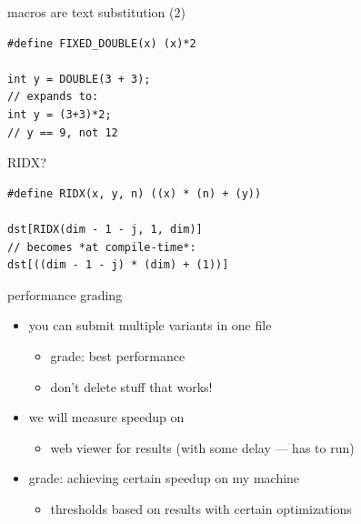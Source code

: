 \begin{frame}[fragile,label=MacrosExplain3]{macros are text substitution (2)}
\lstset{
    language=C,style=small,
}
\begin{lstlisting}
#define FIXED_DOUBLE(x) (x)*2

int y = DOUBLE(3 + 3);
// expands to:
int y = (3+3)*2;
// y == 9, not 12
\end{lstlisting}
\end{frame}

\begin{frame}[fragile,label=RIDXExplain]{RIDX?}
\lstset{
    language=C,style=small,
}
\begin{lstlisting}
#define RIDX(x, y, n) ((x) * (n) + (y))

dst[RIDX(dim - 1 - j, 1, dim)]
// becomes *at compile-time*:
dst[((dim - 1 - j) * (dim) + (1))]
\end{lstlisting}
\end{frame}

\begin{frame}{performance grading}
    \begin{itemize}
    \item you can submit multiple variants in one file
        \begin{itemize}
            \item grade: best performance
            \item don't delete stuff that works!
        \end{itemize}
    \item we will measure speedup on 
        \begin{itemize}
        \item web viewer for results (with some delay --- has to run)
        \end{itemize}
    \item grade: achieving certain speedup on my machine
        \begin{itemize}
        \item thresholds based on results with certain optimizations
        \end{itemize}
    \end{itemize}
\end{frame}

